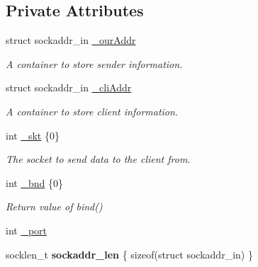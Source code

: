 \subsection*{Private Attributes}
\begin{DoxyCompactItemize}
\item 
struct sockaddr\+\_\+in \hyperlink{classconnector_1_1server_3_01UDP_01_4_a6325152e359abd6a6f8973b6235e566c}{\+\_\+our\+Addr}
\begin{DoxyCompactList}\small\item\em A container to store sender information. \end{DoxyCompactList}\item 
struct sockaddr\+\_\+in \hyperlink{classconnector_1_1server_3_01UDP_01_4_af1b055359697a46b5a82772b5ce1e092}{\+\_\+cli\+Addr}
\begin{DoxyCompactList}\small\item\em A container to store client information. \end{DoxyCompactList}\item 
\mbox{\label{classconnector_1_1server_3_01UDP_01_4_a59ccdadb16911d74c1922e5ee7714fab}} 
int \hyperlink{classconnector_1_1server_3_01UDP_01_4_a59ccdadb16911d74c1922e5ee7714fab}{\+\_\+skt} \{0\}
\begin{DoxyCompactList}\small\item\em The socket to send data to the client from. \end{DoxyCompactList}\item 
\mbox{\label{classconnector_1_1server_3_01UDP_01_4_a29359e63191d7400209dde06f860296e}} 
int \hyperlink{classconnector_1_1server_3_01UDP_01_4_a29359e63191d7400209dde06f860296e}{\+\_\+bnd} \{0\}
\begin{DoxyCompactList}\small\item\em Return value of {\ttfamily bind()} \end{DoxyCompactList}\item 
int \hyperlink{classconnector_1_1server_3_01UDP_01_4_abea57798d63efe457207a47b16001599}{\+\_\+port}
\item 
\mbox{\label{classconnector_1_1server_3_01UDP_01_4_a0bbc4056926ca841d1a4ab6e183950f5}} 
socklen\+\_\+t {\bfseries sockaddr\+\_\+len} \{ sizeof(struct sockaddr\+\_\+in) \}
\end{DoxyCompactItemize}


